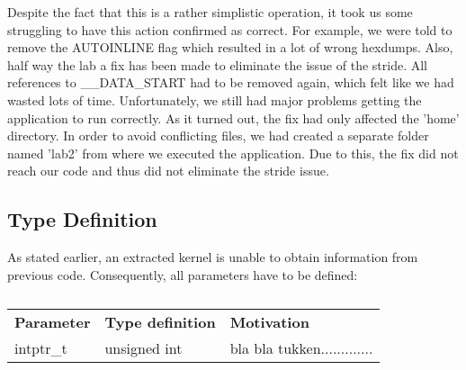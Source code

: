 Despite the fact that this is a rather simplistic operation, it took us some struggling to have this action confirmed as correct. For example, we were told to remove the AUTOINLINE flag which resulted in a lot of wrong hexdumps. Also, half way the lab a fix has been made to eliminate the issue of the stride. All references to \_\_DATA\_START had to be removed again, which felt like we had wasted lots of time. Unfortunately, we still had major problems getting the application to run correctly. As it turned out, the fix had only affected the 'home' directory. In order to avoid conflicting files, we had created a separate folder named 'lab2' from where we executed the application. Due to this, the fix did not reach our code and thus did not eliminate the stride issue.

\subsection{Type Definition}

As stated earlier, an extracted kernel is unable to obtain information from previous code. Consequently, all parameters have to be defined:

\begin{table}%
\begin{tabular}{lll}
	\bf{Parameter} 	& \bf{Type definition} 	& \bf{Motivation}\\ \cline{1-3}
	intptr\_t				&	unsigned int					& bla bla tukken.............
\end{tabular}
\caption{}
\label{}
\end{table}